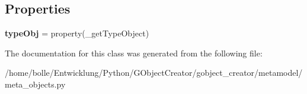 \subsection*{Properties}
\begin{DoxyCompactItemize}
\item 
\hypertarget{classgobject__creator_1_1metamodel_1_1meta__objects_1_1Value_a01cf90340256df30353007224f21423e}{
{\bfseries typeObj} = property(\_\-getTypeObject)}
\label{classgobject__creator_1_1metamodel_1_1meta__objects_1_1Value_a01cf90340256df30353007224f21423e}

\end{DoxyCompactItemize}


The documentation for this class was generated from the following file:\begin{DoxyCompactItemize}
\item 
/home/bolle/Entwicklung/Python/GObjectCreator/gobject\_\-creator/metamodel/meta\_\-objects.py\end{DoxyCompactItemize}
